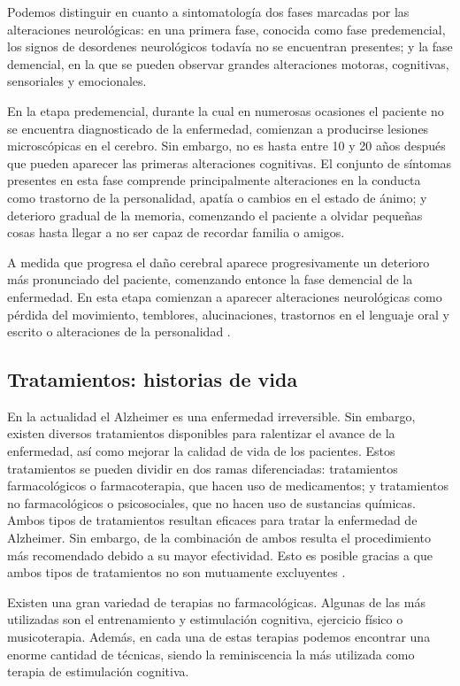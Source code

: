 Podemos distinguir en cuanto a sintomatología dos fases marcadas por las alteraciones neurológicas: en una primera fase, conocida como fase predemencial, los signos de desordenes neurológicos todavía no se encuentran presentes; y la fase demencial, en la que se pueden observar grandes alteraciones motoras, cognitivas, sensoriales y emocionales.

En la etapa predemencial, durante la cual en numerosas ocasiones el paciente no se encuentra diagnosticado de la enfermedad, comienzan a producirse lesiones microscópicas en el cerebro. Sin embargo, no es hasta entre 10 y 20 años después que pueden aparecer las primeras alteraciones cognitivas. El conjunto de síntomas presentes en esta fase comprende principalmente alteraciones en la conducta como trastorno de la personalidad, apatía o cambios en el estado de ánimo; y deterioro gradual de la memoria, comenzando el paciente a olvidar pequeñas cosas hasta llegar a no ser capaz de recordar familia o amigos.

A medida que progresa el daño cerebral aparece progresivamente un deterioro más pronunciado del paciente, comenzando entonce la fase demencial de la enfermedad. En esta etapa comienzan a aparecer alteraciones neurológicas como pérdida del movimiento, temblores, alucinaciones,  trastornos en el lenguaje oral y escrito o alteraciones de la personalidad \citep{alberca-serrano-2010}.


\subsection{Tratamientos: historias de vida}
En la actualidad el Alzheimer es una enfermedad irreversible. Sin embargo, existen diversos tratamientos disponibles para ralentizar el avance de la enfermedad, así como mejorar la calidad de vida de los pacientes. Estos tratamientos se pueden dividir en dos ramas diferenciadas: tratamientos farmacológicos o farmacoterapia, que hacen uso de medicamentos; y tratamientos no farmacológicos o psicosociales, que no hacen uso de sustancias químicas. Ambos tipos de tratamientos resultan eficaces para tratar la enfermedad de Alzheimer. Sin embargo, de la combinación de ambos resulta el procedimiento más recomendado debido a su mayor efectividad. Esto es posible gracias a que ambos tipos de tratamientos no son mutuamente excluyentes \citep{romano2007enfermedad}.

Existen una gran variedad de terapias no farmacológicas. Algunas de las más utilizadas son el entrenamiento y estimulación cognitiva, ejercicio físico o musicoterapia. Además, en cada una de estas terapias podemos encontrar una enorme cantidad de técnicas, siendo la reminiscencia la más utilizada como terapia de estimulación cognitiva.

